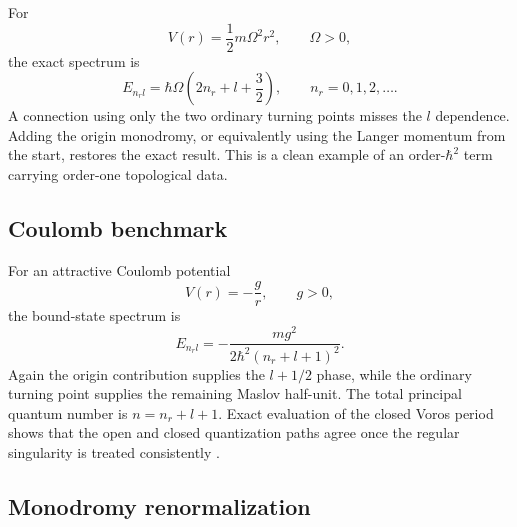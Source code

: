For
\begin{equation}
  V(r)=\frac{1}{2}m\Omega^2r^2,
  \qquad \Omega>0,
  \label{eq:radial-oscillator-potential}
\end{equation}
the exact spectrum is
\begin{equation}
  E_{n_rl}
  =\hbar\Omega
  \left(2n_r+l+\frac{3}{2}\right),
  \qquad n_r=0,1,2,\ldots .
  \label{eq:radial-oscillator-spectrum}
\end{equation}
A connection using only the two ordinary turning points misses the
$l$ dependence.  Adding the origin monodromy, or equivalently using the Langer
momentum from the start, restores the exact result.  This is a clean example
of an order-$\hbar^2$ term carrying order-one topological data.

\subsection{Coulomb benchmark}
\label{subsec:radial-coulomb}

For an attractive Coulomb potential
\begin{equation}
  V(r)=-\frac{g}{r},
  \qquad g>0,
  \label{eq:coulomb-potential}
\end{equation}
the bound-state spectrum is
\begin{equation}
  E_{n_rl}
  =-\frac{mg^2}{2\hbar^2(n_r+l+1)^2} .
  \label{eq:coulomb-spectrum}
\end{equation}
Again the origin contribution supplies the $l+1/2$ phase, while the ordinary
turning point supplies the remaining Maslov half-unit.  The total principal
quantum number is $n=n_r+l+1$.  Exact evaluation of the closed Voros period
shows that the open and closed quantization paths agree once the regular
singularity is treated consistently
\cite{Morikawa:2025ezl}.

\subsection{Monodromy renormalization}
\label{subsec:monodromy-rg}

